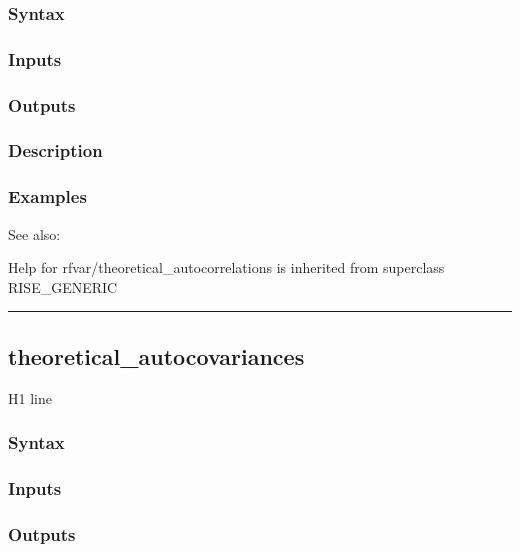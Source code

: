 \documentclass[letterpaper,10pt,english]{sphinxmanual}
\begin{document}
\subsubsection{Syntax}
\label{classes/models/@rfvar/rfvar:id152}

\subsubsection{Inputs}
\label{classes/models/@rfvar/rfvar:id153}

\subsubsection{Outputs}
\label{classes/models/@rfvar/rfvar:id154}

\subsubsection{Description}
\label{classes/models/@rfvar/rfvar:id155}

\subsubsection{Examples}
\label{classes/models/@rfvar/rfvar:id156}
See also:

Help for rfvar/theoretical\_autocorrelations is inherited from superclass RISE\_GENERIC


\bigskip\hrule{}\bigskip



\subsection{theoretical\_autocovariances}
\label{classes/models/@rfvar/rfvar:id157}\label{classes/models/@rfvar/rfvar:theoretical-autocovariances}
H1 line


\subsubsection{Syntax}
\label{classes/models/@rfvar/rfvar:id158}

\subsubsection{Inputs}
\label{classes/models/@rfvar/rfvar:id159}

\subsubsection{Outputs}
\label{classes/models/@rfvar/rfvar:id160}
\end{document}
